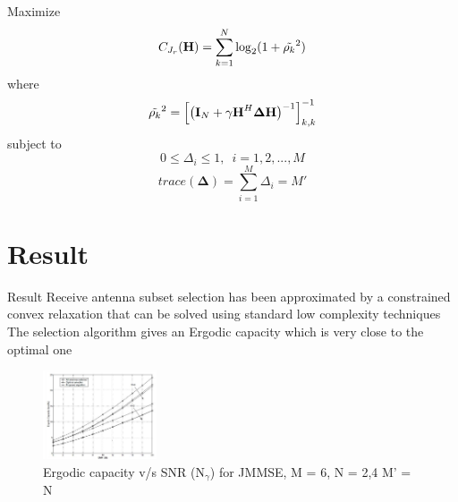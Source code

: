 \documentclass{beamer}
\begin{document}
\begin{frame}{}
Maximize 
$$\mathnormal{C}_{\mathnormal{J_r}}(\mathbf{H}) = \sum_{k=1}^{N} \log_{2}(1 + \Tilde{\rho_{k}}^2)$$
where
$$\Tilde{\rho_{k}}^2 = \Big[\big(\mathbf{I}_N + \gamma\textbf{H}^H\mathbf{\Delta}\textbf{H}\big)^{-1}\Big]_{k,k}^{-1}$$
subject to
$$0\leq\Delta_{i}\leq1,\enspace i=1,2,...,M$$
$$trace(\mathbf{\Delta})=\sum_{i=1}^{M} \Delta_i = M'$$
\end{frame}

\section{Result}

\begin{frame}{Result}
Receive antenna subset selection has been approximated by a constrained convex relaxation  that can be solved using standard low
complexity techniques\\
\vskip 0.1in
The selection algorithm gives an Ergodic capacity which is very close to the optimal one
\begin{figure}[h]
\centering
\includegraphics[width=0.3\textwidth]{JMMSE_SNR.JPG}
\caption{Ergodic capacity v/s SNR (N$_\gamma$) for JMMSE, M = 6, N = 2,4 M' = N}
\end{figure}
\end{frame}
\end{document}
